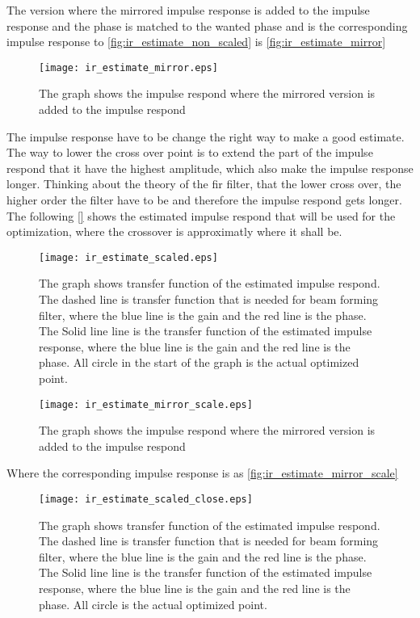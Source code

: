The version where the mirrored impulse response is added to the impulse response and the phase is matched to the wanted phase and is the corresponding impulse response to \autoref{fig:ir_estimate_non_scaled} is \autoref{fig:ir_estimate_mirror}

\begin{figure}[H]
	\centering
	\texttt{[image: ir\_estimate\_mirror.eps]}
	\caption{The graph shows the impulse respond where the mirrored version is added to the impulse respond}
		\label{fig:ir_estimate_mirror}
\end{figure}


The impulse response have to be change the right way to make a good estimate. The way to lower the cross over point is to extend the part of the impulse respond that it have the highest amplitude, which also make the impulse response longer. Thinking about the theory of the \gls{fir} filter, that the lower cross over, the higher order the filter have to be and therefore the impulse respond gets longer. The following \autoref{} shows the estimated impulse respond that will be used for the optimization, where the crossover is approximatly where it shall be. 


\begin{figure}[H]
	\centering
	\texttt{[image: ir\_estimate\_scaled.eps]}
	\caption{The graph shows transfer function of the estimated impulse respond. The dashed line is transfer function that is needed for beam forming filter, where the blue line is the gain and the red line is the phase. The Solid line line is the transfer function of the estimated impulse response, where the blue line is the gain and the red line is the phase. All circle in the start of the graph is the actual optimized point.}
		\label{fig:ir_estimate_scaled}
\end{figure}


\begin{figure}[H]
	\centering
	\texttt{[image: ir\_estimate\_mirror\_scale.eps]}
	\caption{The graph shows the impulse respond where the mirrored version is added to the impulse respond}
		\label{fig:ir_estimate_mirror_scale}
\end{figure}

Where the corresponding impulse response is as \autoref{fig:ir_estimate_mirror_scale}

\begin{figure}[H]
	\centering
	\texttt{[image: ir\_estimate\_scaled\_close.eps]}
	\caption{The graph shows transfer function of the estimated impulse respond. The dashed line is transfer function that is needed for beam forming filter, where the blue line is the gain and the red line is the phase. The Solid line line is the transfer function of the estimated impulse response, where the blue line is the gain and the red line is the phase. All circle is the actual optimized point.}
		\label{fig:ir_estimate_scaled_close}
\end{figure}

